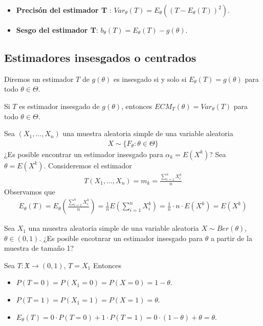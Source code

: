 \begin{defi}
    \begin{itemize}
        \item \textbf{Precisón del estimador T} : $Var_{\theta}(T) = E_{\theta}((T-E_{\theta}(T))^2)$.
        \item \textbf{Sesgo del estimador T}: $b_{\theta}(T) = E_{\theta}(T) - g(\theta)$.
    \end{itemize}
\end{defi}

\subsection{Estimadores insesgados o centrados}

\begin{defi}
    Diremos un estimador $T$ de $g(\theta)$ es insesgado si y solo si $E_{\theta}(T) = g(\theta)$ para todo $\theta \in \Theta$.
\end{defi}

\begin{obs}
    Si $T$ es estimador insesgado de $g(\theta)$, entonces $ECM_{T}(\theta) = Var_{\theta}(T)$ para todo $\theta \in \Theta$.
\end{obs}
\begin{ejemplo}
    Sea $(X_1,...,X_n)$ una muestra aleatoria simple de una variable aleatoria
    \begin{align*}
        X \sim \{F_{\theta} : \theta \in \Theta \}
    \end{align*}
    ¿Es posible encontrar un estimador insesgado para $\alpha_k = E\left(X^k\right)$? Sea $\theta = E\left(X^k\right)$. Consideremos el estimador
    \begin{align*}
        T(X_1,...,X_n) = m_k= \frac{\sum_{i=1}^{n}{X_i^k}}{n}
    \end{align*}
    Observamos que
    \begin{align*}
        E_{\theta}(T) = E_{\theta}\left( \frac{\sum_{i=1}^{n}{X_i^k}}{n} \right) = \frac{1}{n}E\left( \sum_{i=1}^{n}{X_i^k} \right) = \frac{1}{n} \cdot n \cdot E\left( X^k\right) = E\left( X^k\right)
    \end{align*}
\end{ejemplo}

\begin{ejemplo}
    Sea $X_1$ una muestra aleatoria simple de una variable aleatoria $X \sim Ber(\theta)$, $\theta \in (0,1)$. ¿Es posible encotnrar un estimador insesgado para $\theta$ a partir de la muestra de tamaño 1?

    Sea $T : \mathfrak{X} \longrightarrow (0,1)$, $T = X_1$ Entonces
    \begin{itemize}
        \item $P(T = 0) = P(X_1 = 0) = P(X = 0) = 1 - \theta$.
        \item $P(T = 1) = P(X_1 = 1) = P(X = 1) = \theta$.
        \item $E_{\theta}(T) = 0 \cdot P(T = 0) + 1 \cdot P(T = 1) = 0 \cdot (1 - \theta) + \theta = \theta$.
    \end{itemize}
\end{ejemplo}

